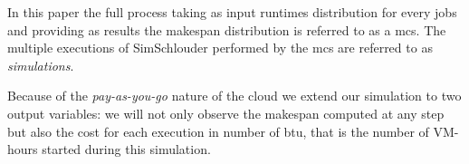 \documentclass[10pt,conference,compsocconf]{IEEEtran}
\begin{document}
In this paper the full process taking as input runtimes distribution for
every jobs and providing as results the makespan distribution is referred to as a
\acf{mcs}. The multiple executions of SimSchlouder performed by the \ac{mcs} are
referred to as \emph{simulations}.

Because of the \emph{pay-as-you-go} nature of the cloud we extend our simulation
to two output variables: we will not only observe the makespan computed at any
step but also the cost for each execution in number of \ac{btu}, that is the
number of VM-hours started during this simulation.

\end{document}

